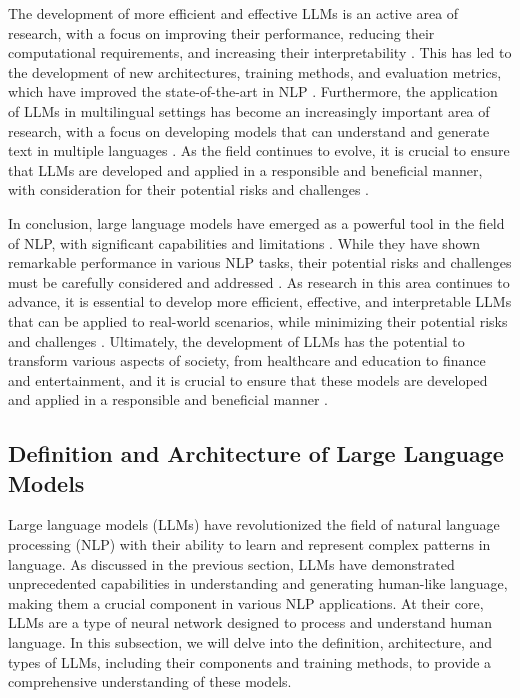 \documentclass[11pt]{article}
\begin{document}
The development of more efficient and effective LLMs is an active area of research, with a focus on improving their performance, reducing their computational requirements, and increasing their interpretability \cite{ref11}. This has led to the development of new architectures, training methods, and evaluation metrics, which have improved the state-of-the-art in NLP \cite{ref12}. Furthermore, the application of LLMs in multilingual settings has become an increasingly important area of research, with a focus on developing models that can understand and generate text in multiple languages \cite{ref13}. As the field continues to evolve, it is crucial to ensure that LLMs are developed and applied in a responsible and beneficial manner, with consideration for their potential risks and challenges \cite{ref14}.

In conclusion, large language models have emerged as a powerful tool in the field of NLP, with significant capabilities and limitations \cite{ref1}. While they have shown remarkable performance in various NLP tasks, their potential risks and challenges must be carefully considered and addressed \cite{ref15}. As research in this area continues to advance, it is essential to develop more efficient, effective, and interpretable LLMs that can be applied to real-world scenarios, while minimizing their potential risks and challenges \cite{ref11}. Ultimately, the development of LLMs has the potential to transform various aspects of society, from healthcare and education to finance and entertainment, and it is crucial to ensure that these models are developed and applied in a responsible and beneficial manner \cite{ref16}.

\subsection{Definition and Architecture of Large Language Models}

Large language models (LLMs) have revolutionized the field of natural language processing (NLP) with their ability to learn and represent complex patterns in language. As discussed in the previous section, LLMs have demonstrated unprecedented capabilities in understanding and generating human-like language, making them a crucial component in various NLP applications. At their core, LLMs are a type of neural network designed to process and understand human language. In this subsection, we will delve into the definition, architecture, and types of LLMs, including their components and training methods, to provide a comprehensive understanding of these models.
\end{document}
